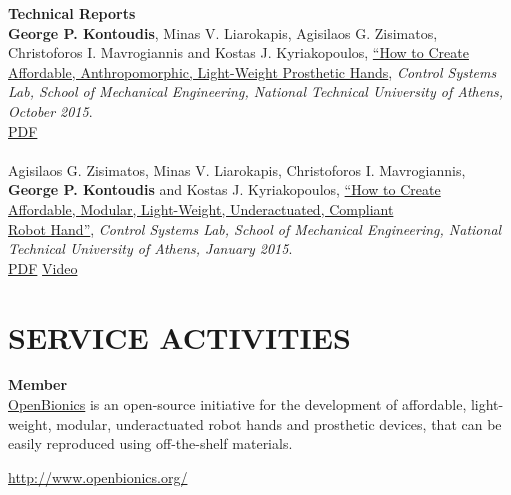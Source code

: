 \documentclass[11pt]{res} %
\begin{document}
\begin{resume}
\small\textbf {Technical Reports}
\\\textbf {\rbrack \hspace{0.05cm}}\small\textbf{George P. Kontoudis}, Minas V. Liarokapis, Agisilaos G. Zisimatos, Christoforos I. Mavrogiannis and Kostas J. Kyriakopoulos, \underline{``How to Create Affordable, Anthropomorphic, Light-Weight
Prosthetic Hands}, {\it Control Systems Lab, School of Mechanical Engineering, National Technical University of Athens, October 2015}. 
\\\href{http://www.georgekontoudis.com/Publications/TR2015_OpenBionics_ProstheticHandsGuide.pdf}
{\lbrack PDF\rbrack}
\\\\ \textbf {\rbrack \hspace{0.05cm}}Agisilaos G. Zisimatos, Minas V. Liarokapis, Christoforos I. Mavrogiannis, \small\textbf{George P. Kontoudis} and Kostas J. Kyriakopoulos, \underline{``How to Create Affordable, Modular, Light-Weight, Underactuated, Compliant }\\\underline{Robot Hand''}, {\it Control Systems Lab, School of Mechanical Engineering, National Technical University of Athens, January 2015}.\\
\href{http://www.georgekontoudis.com/Publications/TR2015_OpenBionics_RobotHandsGuide.pdf}{\lbrack PDF\rbrack}
\href{https://www.youtube.com/watch?v=Z8mkwvJW-Xs}{\lbrack Video\rbrack}

\vspace{0in} %

\section{SERVICE ACTIVITIES} 
\vspace{4pt} %
\small\textbf{Member}\\
\underline{OpenBionics} is an open-source initiative for the development of affordable, light-weight, modular, underactuated
robot hands and prosthetic devices, that can be easily reproduced using off-the-shelf materials. \begin {center}
\url{http://www.openbionics.org/}
\end {center}


\end{resume}
\end{document}
